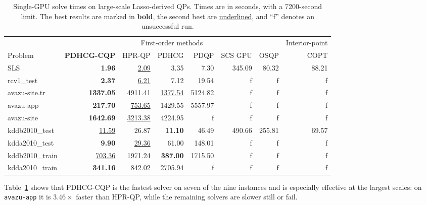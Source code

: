 \documentclass[letterpaper]{article} %
\newcommand{\name}{PDHCG-CQP\xspace}
\theoremstyle{definition}
\theoremstyle{remark}
\newcommand{\papertablesetup}{\small\setstretch{1.0}\renewcommand{\arraystretch}{1.2}}
\begin{document}
\begin{table}[htbp]
  \centering
  \papertablesetup
  \caption{Single-GPU solve times on large-scale Lasso-derived QPs. Times
  are in seconds, with a 7200-second limit. The best results are marked in
  \textbf{bold}, the second best are \underline{underlined}, and ``f''
  denotes an unsuccessful run.}
  \label{real_lasso}
  \medskip
    \begin{tabular}{lrrrrrrr}
    \toprule
    & \multicolumn{6}{c}{First-order methods}
      & \multicolumn{1}{c}{Interior-point} \\
    \cmidrule(lr){2-7}\cmidrule(lr){8-8}
    Problem & \textbf{\name} & HPR-QP & PDHCG & PDQP & SCS GPU & OSQP & COPT \\
    \midrule
    SLS & \textbf{1.96} & \underline{2.09} & 3.35 & 7.30 & 345.09 & 80.32 & 88.21 \\
    rcv1\_test & \textbf{2.37} & \underline{6.21} & 7.12 & 19.54 & f & f & f \\
    avazu-site.tr & \textbf{1337.05} & 4911.41 & \underline{1377.54} & 5124.82 & f & f & f \\
    avazu-app & \textbf{217.70} & \underline{753.65} & 1429.55 & 5557.97 & f & f & f \\
    avazu-site & \textbf{1642.69} & \underline{3213.38} & 4224.95 & f & f & f & f \\
    kddb2010\_test & \underline{11.59} & 26.87 & \textbf{11.10} & 46.49 & 490.66 & 255.81 & 69.57 \\
    kdda2010\_test & \textbf{9.90} & \underline{29.36} & 61.00 & 148.01 & f & f & f \\
    kddb2010\_train & \underline{703.36} & 1971.24 & \textbf{387.00} & 1715.50 & f & f & f \\
    kdda2010\_train & \textbf{341.16} & \underline{842.02} & 2705.94 & f & f & f & f \\
    \bottomrule
  \end{tabular}
\end{table}

Table~\ref{real_lasso} shows that \name is the fastest solver on seven of
the nine instances and is especially effective at the largest scales: on
\texttt{avazu-app} it is $3.46\times$ faster than HPR-QP, while the
remaining solvers are slower still or fail.
\end{document}
